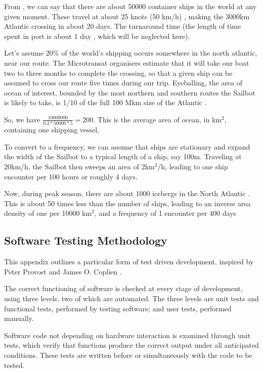 From \cite{jallal__how-many-ships}, we can say that there are about 50000 container ships in the world at any given moment. These travel at about 25 knots (50 km/h) \cite{maersk__triple-e-class}, making the 3000km Atlantic crossing in about 20 days. The turnaround time (the length of time spent in port is about 1 day \cite{port-technology__global-turnaround-times}, which will be neglected here).

Let's assume 20\% of the world's shipping occurs somewhere in the north atlantic, near our route. The Microtransat organisers estimate that it will take our boat two to three months to complete the crossing, so that a given ship can be assumed to cross our route five times during our trip. Eyeballing, the area of ocean of interest, bounded by the most northern and southern routes the Sailbot is likely to take, is 1/10 of the full 100 Mkm size of the Atlantic \cite{worldatlas__atlantic-ocean}.

So, we have $\frac{10000000}{0.2*50000*5}=200$. This is the average area of ocean, in km$^2$, containing one shipping vessel.

To convert to a frequency, we can assume that ships are stationary and expand the width of the Sailbot to a typical length of a ship, say 100m. Traveling at 20km/h, the Sailbot then sweeps an area of 2km$^2$/h, leading to one ship encounter per 100 hours or roughly 4 days.

Now, during peak season, there are about 1000 icebergs in the North Atlantic \cite{natgeo__iceberg-frequency}. This is about 50 times less than the number of ships, leading to an inverse area density of one per 10000 km$^2$, and a frequency of 1 encounter per 400 days


\subsection{\label{app:software-testing-methodology}Software Testing Methodology}
This appendix outlines a particular form of test driven development, inspired by Peter Provost \cite{provost-tdd} and James O. Coplien \cite{coplien-tdd-waste}.

The correct functioning of software is checked at every stage of development, using three levels, two of which are automated. The three levels are unit tests and functional tests, performed by testing software; and user tests, performed manually.

Software code not depending on hardware interaction is examined through unit tests, which verify that functions produce the correct output under all anticipated conditions. These tests are written before or simultaneously with the code to be tested.

